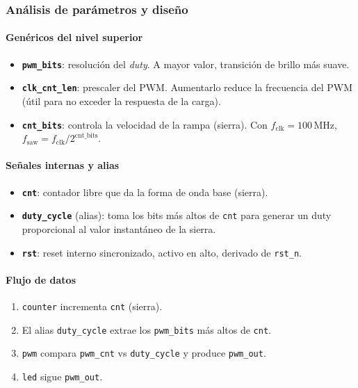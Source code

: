 \documentclass[a4paper,12pt]{article}
\begin{document}
\subsubsection{Análisis de parámetros y diseño}

\paragraph{Genéricos del nivel superior}
\begin{itemize}
  \item \textbf{\texttt{pwm\_bits}}: resolución del \textit{duty}. A mayor valor, transición de brillo más suave.
  \item \textbf{\texttt{clk\_cnt\_len}}: prescaler del PWM. Aumentarlo reduce la frecuencia del PWM (útil para no exceder la respuesta de la carga).
  \item \textbf{\texttt{cnt\_bits}}: controla la velocidad de la rampa (sierra). Con \(f_\text{clk}=100\,\text{MHz}\), \(f_\text{saw}=f_\text{clk}/2^{\text{cnt\_bits}}\). 
\end{itemize}

\paragraph{Señales internas y alias}
\begin{itemize}
  \item \textbf{\texttt{cnt}}: contador libre que da la forma de onda base (sierra).
  \item \textbf{\texttt{duty\_cycle}} (alias): toma los bits más altos de \texttt{cnt} para generar un duty proporcional al valor instantáneo de la sierra.
  \item \textbf{\texttt{rst}}: reset interno sincronizado, activo en alto, derivado de \texttt{rst\_n}.
\end{itemize}

\paragraph{Flujo de datos}
\begin{enumerate}
  \item \texttt{counter} incrementa \texttt{cnt} (sierra).
  \item El alias \texttt{duty\_cycle} extrae los \texttt{pwm\_bits} más altos de \texttt{cnt}.
  \item \texttt{pwm} compara \texttt{pwm\_cnt} vs \texttt{duty\_cycle} y produce \texttt{pwm\_out}.
  \item \texttt{led} sigue \texttt{pwm\_out}.
\end{enumerate}
\end{document}

